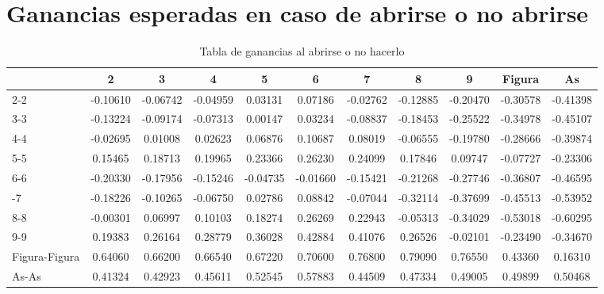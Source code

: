 \documentclass[12pt,a4paper,]{book}
\def\ifprincipal{} %
\numberwithin{dummy}{section}
\theoremstyle{ocrenumbox}
\theoremstyle{blacknumex}
\theoremstyle{blacknumbox}
\theoremstyle{ocrenum}
\theoremstyle{ocrenum}
\begin{document}
\hypertarget{ganancias-esperadas-en-caso-de-abrirse-o-no-abrirse}{%
\section{Ganancias esperadas en caso de abrirse o no
abrirse}\label{ganancias-esperadas-en-caso-de-abrirse-o-no-abrirse}}

\begingroup\fontsize{12}{14}\selectfont

\begin{longtable}[t]{lcccccccccc}
\caption{\label{tab:unnamed-chunk-78}Tabla de ganancias al abrirse o no hacerlo}\\
\toprule
 & 2 & 3 & 4 & 5 & 6 & 7 & 8 & 9 & Figura & As\\
\midrule
2-2 & -0.10610 & -0.06742 & -0.04959 & 0.03131 & 0.07186 & -0.02762 & -0.12885 & -0.20470 & -0.30578 & -0.41398\\
3-3 & -0.13224 & -0.09174 & -0.07313 & 0.00147 & 0.03234 & -0.08837 & -0.18453 & -0.25522 & -0.34978 & -0.45107\\
4-4 & -0.02695 & 0.01008 & 0.02623 & 0.06876 & 0.10687 & 0.08019 & -0.06555 & -0.19780 & -0.28666 & -0.39874\\
5-5 & 0.15465 & 0.18713 & 0.19965 & 0.23366 & 0.26230 & 0.24099 & 0.17846 & 0.09747 & -0.07727 & -0.23306\\
6-6 & -0.20330 & -0.17956 & -0.15246 & -0.04735 & -0.01660 & -0.15421 & -0.21268 & -0.27746 & -0.36807 & -0.46595\\
\addlinespace
7-7 & -0.18226 & -0.10265 & -0.06750 & 0.02786 & 0.08842 & -0.07044 & -0.32114 & -0.37699 & -0.45513 & -0.53952\\
8-8 & -0.00301 & 0.06997 & 0.10103 & 0.18274 & 0.26269 & 0.22943 & -0.05313 & -0.34029 & -0.53018 & -0.60295\\
9-9 & 0.19383 & 0.26164 & 0.28779 & 0.36028 & 0.42884 & 0.41076 & 0.26526 & -0.02101 & -0.23490 & -0.34670\\
Figura-Figura & 0.64060 & 0.66200 & 0.66540 & 0.67220 & 0.70600 & 0.76800 & 0.79090 & 0.76550 & 0.43360 & 0.16310\\
As-As & 0.41324 & 0.42923 & 0.45611 & 0.52545 & 0.57883 & 0.44509 & 0.47334 & 0.49005 & 0.49899 & 0.50468\\
\bottomrule
\end{longtable}
\endgroup{}

\ifdefined\ifprincipal
\else
\setlength{\parindent}{1em}
\pagestyle{fancy}
\setcounter{tocdepth}{4}
\tableofcontents

\fi
\end{document}

